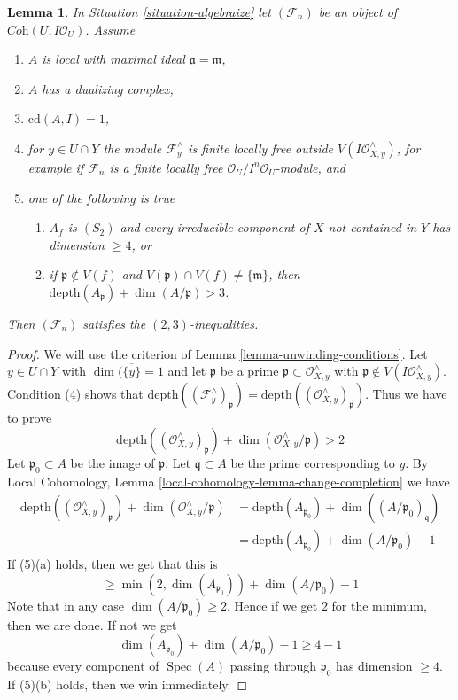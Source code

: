 \documentclass{stacks-project}
\theoremstyle{plain}
\newtheorem{lemma}[subsection]{Lemma}
\theoremstyle{definition}
\theoremstyle{remark}
\numberwithin{equation}{subsection}
\def\Spec{\mathop{\mathrm{Spec}}}
\begin{document}
\begin{lemma}
\label{lemma-unwinding-conditions-bis}
In Situation \ref{situation-algebraize} let $(\mathcal{F}_n)$ be an object
of $\textit{Coh}(U, I\mathcal{O}_U)$. Assume
\begin{enumerate}
\item $A$ is local with maximal ideal $\mathfrak a = \mathfrak m$,
\item $A$ has a dualizing complex,
\item $\text{cd}(A, I) = 1$,
\item for $y \in U \cap Y$ the module $\mathcal{F}_y^\wedge$
is finite locally free outside $V(I\mathcal{O}_{X, y}^\wedge)$,
for example if $\mathcal{F}_n$ is a finite locally free
$\mathcal{O}_U/I^n\mathcal{O}_U$-module, and
\item one of the following is true
\begin{enumerate}
\item $A_f$ is $(S_2)$ and every irreducible component of $X$
not contained in $Y$ has dimension $\geq 4$, or
\item if $\mathfrak p \not \in V(f)$ and
$V(\mathfrak p) \cap V(f) \not = \{\mathfrak m\}$, then
$\text{depth}(A_\mathfrak p) + \dim(A/\mathfrak p) > 3$.
\end{enumerate}
\end{enumerate}
Then $(\mathcal{F}_n)$ satisfies the $(2, 3)$-inequalities.
\end{lemma}

\begin{proof}
We will use the criterion of Lemma \ref{lemma-unwinding-conditions}.
Let $y \in U \cap Y$ with $\dim(\overline{\{y\}} = 1$ and let
$\mathfrak p$ be a prime $\mathfrak p \subset \mathcal{O}_{X, y}^\wedge$ with
$\mathfrak p \not \in V(I\mathcal{O}_{X, y}^\wedge)$.
Condition (4) shows that
$\text{depth}((\mathcal{F}_y^\wedge)_\mathfrak p) =
\text{depth}((\mathcal{O}_{X, y}^\wedge)_\mathfrak p)$.
Thus we have to prove
$$
\text{depth}((\mathcal{O}_{X, y}^\wedge)_\mathfrak p) +
\dim(\mathcal{O}_{X, y}^\wedge/\mathfrak p) > 2
$$
Let $\mathfrak p_0 \subset A$ be the image of $\mathfrak p$.
Let $\mathfrak q \subset A$ be the prime corresponding to $y$.
By Local Cohomology, Lemma
\ref{local-cohomology-lemma-change-completion}
we have
\begin{align*}
\text{depth}((\mathcal{O}_{X, y}^\wedge)_\mathfrak p) +
\dim(\mathcal{O}_{X, y}^\wedge/\mathfrak p)
& =
\text{depth}(A_{\mathfrak p_0}) + \dim((A/\mathfrak p_0)_\mathfrak q) \\
& =
\text{depth}(A_{\mathfrak p_0}) + \dim(A/\mathfrak p_0) - 1
\end{align*}
If (5)(a) holds, then we get that this is
$$
\geq \min(2, \dim(A_{\mathfrak p_0})) + \dim(A/\mathfrak p_0) - 1
$$
Note that in any case $\dim(A/\mathfrak p_0) \geq 2$. Hence if
we get $2$ for the minimum, then we are done. If not we get
$$
\dim(A_{\mathfrak p_0}) + \dim(A/\mathfrak p_0) - 1 \geq 4 - 1
$$
because every component of $\Spec(A)$ passing through $\mathfrak p_0$
has dimension $\geq 4$. If (5)(b) holds, then we win immediately.
\end{proof}
\end{document}

